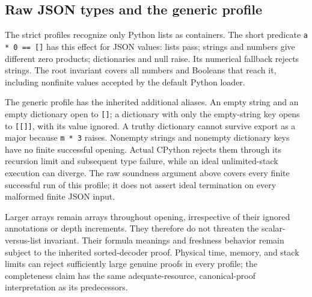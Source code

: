 \documentclass[11pt,letterpaper]{article}
\theoremstyle{definition}\newtheorem{definition}[theorem]{Definition}
\theoremstyle{remark}\newtheorem{remark}[theorem]{Remark}
\begin{document}
\subsection{Raw JSON types and the generic profile}

The strict profiles recognize only Python lists as containers.  The
short predicate \texttt{a * 0 == []} has this effect for JSON values:
lists pass; strings and numbers give different zero products;
dictionaries and null raise.  Its numerical fallback rejects strings.
The root invariant covers all numbers and Booleans that reach it,
including nonfinite values accepted by the default Python loader.

The generic profile has the inherited additional aliases.  An empty
string and an empty dictionary open to \texttt{[]}; a dictionary with
only the empty-string key opens to \texttt{[[]]}, with its value ignored.
A truthy dictionary cannot survive export as a major because
\texttt{m * 3} raises.  Nonempty strings and nonempty dictionary keys
have no finite successful opening.  Actual CPython rejects them through
its recursion limit and subsequent type failure, while an ideal
unlimited-stack execution can diverge.  The raw soundness argument
above covers every finite successful run of this profile; it does not
assert ideal termination on every malformed finite JSON input.

Larger arrays remain arrays throughout opening, irrespective of their
ignored annotations or depth increments.  They therefore do not
threaten the scalar-versus-list invariant.  Their formula meanings and
freshness behavior remain subject to the inherited sorted-decoder
proof.  Physical time, memory, and stack limits can reject sufficiently
large genuine proofs in every profile; the completeness claim has the
same adequate-resource, canonical-proof interpretation as its
predecessors.
\end{document}
